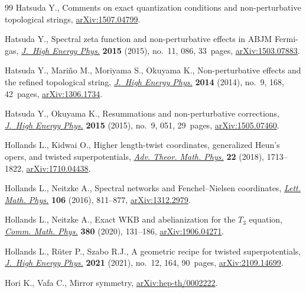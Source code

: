 \documentclass[pdftex]{sigma}
\numberwithin{equation}{section}
\begin{document}
\begin{thebibliography}{99}
Hatsuda Y., Comments on exact quantization conditions and non-perturbative
 topological strings, \href{https://arxiv.org/abs/1507.04799}{arXiv:1507.04799}.

Hatsuda Y., Spectral zeta function and non-perturbative effects in {ABJM}
 {F}ermi-gas, \href{https://doi.org/10.1007/JHEP11(2015)086}{\textit{J.~High Energy Phys.}} \textbf{2015} (2015), no.~11, 086,
 33~pages, \href{https://arxiv.org/abs/1503.07883}{arXiv:1503.07883}.

Hatsuda Y., Mari\~no M., Moriyama S., Okuyama K., Non-perturbative effects and
 the refined topological string, \href{https://doi.org/10.1007/JHEP09(2014)168}{\textit{J.~High Energy Phys.}} \textbf{2014}
 (2014), no.~9, 168, 42~pages, \href{https://arxiv.org/abs/1306.1734}{arXiv:1306.1734}.

Hatsuda Y., Okuyama K., Resummations and non-perturbative corrections,
 \href{https://doi.org/10.1007/JHEP09(2015)051}{\textit{J.~High Energy Phys.}} \textbf{2015} (2015), no.~9, 051, 29~pages,
 \href{https://arxiv.org/abs/1505.07460}{arXiv:1505.07460}.

Hollands L., Kidwai O., Higher length-twist coordinates, generalized {H}eun's
 opers, and twisted superpotentials, \href{https://doi.org/10.4310/ATMP.2018.v22.n7.a2}{\textit{Adv. Theor. Math. Phys.}}
 \textbf{22} (2018), 1713--1822, \href{https://arxiv.org/abs/1710.04438}{arXiv:1710.04438}.

Hollands L., Neitzke A., Spectral networks and {F}enchel--{N}ielsen
 coordinates, \href{https://doi.org/10.1007/s11005-016-0842-x}{\textit{Lett. Math. Phys.}} \textbf{106} (2016), 811--877,
 \href{https://arxiv.org/abs/1312.2979}{arXiv:1312.2979}.

Hollands L., Neitzke A., Exact {WKB} and abelianization for the {$T_3$}
 equation, \href{https://doi.org/10.1007/s00220-020-03875-1}{\textit{Comm. Math. Phys.}} \textbf{380} (2020), 131--186,
 \href{https://arxiv.org/abs/1906.04271}{arXiv:1906.04271}.

Hollands L., R\"uter P., Szabo R.J., A geometric recipe for twisted
 superpotentials, \href{https://doi.org/10.1007/jhep12(2021)164}{\textit{J.~High Energy Phys.}} \textbf{2021} (2021), no.~12,
 164, 90~pages, \href{https://arxiv.org/abs/2109.14699}{arXiv:2109.14699}.

Hori K., Vafa C., Mirror symmetry, \href{https://arxiv.org/abs/hep-th/0002222}{arXiv:hep-th/0002222}.


\end{thebibliography}
\end{document}
